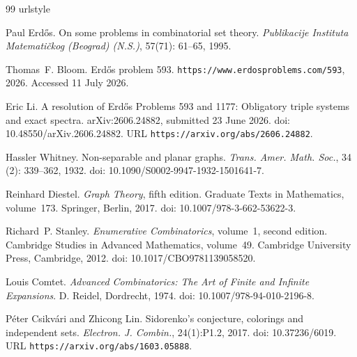 \documentclass[a4paper,11pt,reqno]{amsart}
\theoremstyle{plain}
\theoremstyle{definition}
\theoremstyle{remark}
\begin{document}
\begin{thebibliography}{99}
\providecommand{\natexlab}[1]{#1}
\providecommand{\url}[1]{\texttt{#1}}
\expandafter\ifx\csname urlstyle\endcsname\relax
  \providecommand{\doi}[1]{doi: #1}\else
  \providecommand{\doi}{doi: \begingroup \urlstyle{rm}\Url}\fi

Paul Erd{\H{o}}s.
\newblock On some problems in combinatorial set theory.
\newblock \emph{Publikacije Instituta Matemati\v{c}kog (Beograd) (N.S.)},
  57(71): 61--65, 1995.

Thomas~F. Bloom.
\newblock Erd{\H{o}}s problem 593.
\newblock \url{https://www.erdosproblems.com/593}, 2026.
\newblock Accessed 11 July 2026.

Eric Li.
\newblock A resolution of {Erd{\H{o}}s Problems 593 and 1177}: Obligatory
  triple systems and exact spectra.
\newblock arXiv:2606.24882, submitted 23 June 2026.
\newblock \doi{10.48550/arXiv.2606.24882}.
\newblock URL \url{https://arxiv.org/abs/2606.24882}.

Hassler Whitney.
\newblock Non-separable and planar graphs.
\newblock \emph{Trans. Amer. Math. Soc.}, 34 (2):
  339--362, 1932.
\newblock \doi{10.1090/S0002-9947-1932-1501641-7}.

Reinhard Diestel.
\newblock \emph{Graph Theory}, fifth edition.
\newblock Graduate Texts in Mathematics, volume~173. Springer, Berlin,
  2017.
\newblock \doi{10.1007/978-3-662-53622-3}.

Richard~P. Stanley.
\newblock \emph{Enumerative Combinatorics}, volume~1, second edition.
\newblock Cambridge Studies in Advanced Mathematics, volume~49. Cambridge
  University Press, Cambridge, 2012.
\newblock \doi{10.1017/CBO9781139058520}.

Louis Comtet.
\newblock \emph{Advanced Combinatorics: The Art of Finite and Infinite Expansions}.
\newblock D. Reidel, Dordrecht, 1974.
\newblock \doi{10.1007/978-94-010-2196-8}.

P{\'e}ter Csikv{\'a}ri and Zhicong Lin.
\newblock Sidorenko's conjecture, colorings and independent sets.
\newblock \emph{Electron. J. Combin.}, 24(1):P1.2, 2017.
\newblock \doi{10.37236/6019}.
\newblock URL \url{https://arxiv.org/abs/1603.05888}.


\end{thebibliography}
\end{document}
